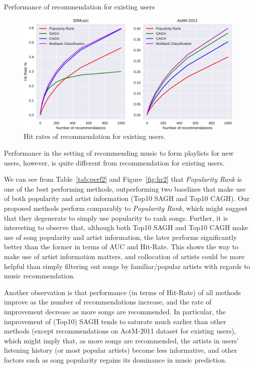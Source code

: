 \begin{table}[t]
\centering
\caption{Performance of recommendation for existing users}
\label{tab:perf1}
\resizebox{\columnwidth}{!}{

}
\end{table}


\begin{figure}[t]
\centering
\includegraphics[width=\linewidth]{fig/hitrate1.pdf}
\caption{Hit rates of recommendation for existing users.}
\label{fig:hr1}
\end{figure}


Performance in the setting of recommending music to form playlists for new users,
however, is quite different from recommendation for existing users.

We can see from Table~\ref{tab:perf2} and Figure~\ref{fig:hr2} that {\it Popularity Rank} is one of the best performing methods,
outperforming two baselines that make use of both popularity and artist information (\ie Top10 SAGH and Top10 CAGH).
Our proposed methods perform comparably to {\it Popularity Rank}, which might suggest that they degenerate to simply use popularity to rank songs.
Further, it is interesting to observe that, although both Top10 SAGH and Top10 CAGH make use of song popularity and artist information,
the later performs significantly better than the former in terms of AUC and Hit-Rate.
This shows the way to make use of artist information matters,
and collocation of artists could be more helpful than simply filtering out songs by familiar/popular artists
with regards to music recommendation.

Another observation is that performance (in terms of Hit-Rate) of all methods improve as the number of recommendations increase,
and the rate of improvement decrease as more songs are recommended.
In particular, the improvement of (Top10) SAGH tends to saturate much earlier than other methods
(except recommendations on AotM-2011 dataset for existing users),
which might imply that, as more songs are recommended, the artists in users' listening history
(or most popular artists) become less informative,
and other factors such as song popularity regains its dominance in music prediction.

